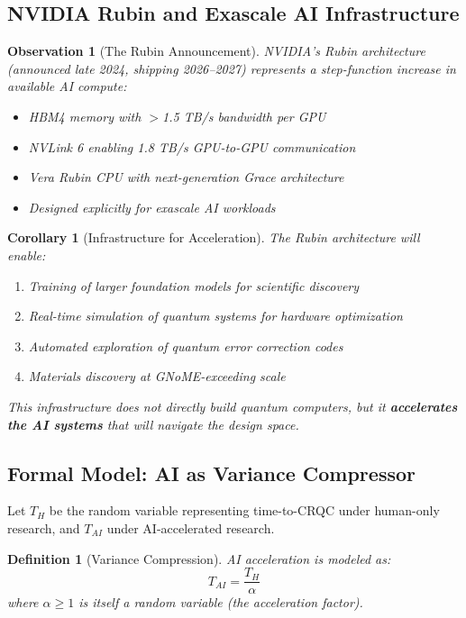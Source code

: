 \documentclass[11pt,a4paper]{article}
\newtheorem{corollary}[theorem]{Corollary}
\newtheorem{definition}[theorem]{Definition}
\newtheorem{observation}[theorem]{Observation}
\begin{document}
\subsection{NVIDIA Rubin and Exascale AI Infrastructure}

\begin{observation}[The Rubin Announcement]
NVIDIA's Rubin architecture (announced late 2024, shipping 2026--2027) represents a step-function increase in available AI compute:
\begin{itemize}[noitemsep]
    \item HBM4 memory with $>$1.5 TB/s bandwidth per GPU
    \item NVLink 6 enabling 1.8 TB/s GPU-to-GPU communication
    \item Vera Rubin CPU with next-generation Grace architecture
    \item Designed explicitly for exascale AI workloads
\end{itemize}
\end{observation}

\begin{corollary}[Infrastructure for Acceleration]
The Rubin architecture will enable:
\begin{enumerate}[noitemsep]
    \item Training of larger foundation models for scientific discovery
    \item Real-time simulation of quantum systems for hardware optimization
    \item Automated exploration of quantum error correction codes
    \item Materials discovery at GNoME-exceeding scale
\end{enumerate}
This infrastructure does not directly build quantum computers, but it \textbf{accelerates the AI systems} that will navigate the design space.
\end{corollary}

\subsection{Formal Model: AI as Variance Compressor}

Let $T_H$ be the random variable representing time-to-CRQC under human-only research, and $T_{AI}$ under AI-accelerated research.

\begin{definition}[Variance Compression]
AI acceleration is modeled as:
\begin{equation}
T_{AI} = \frac{T_H}{\alpha}
\end{equation}
where $\alpha \geq 1$ is itself a random variable (the acceleration factor).
\end{definition}
\end{document}
